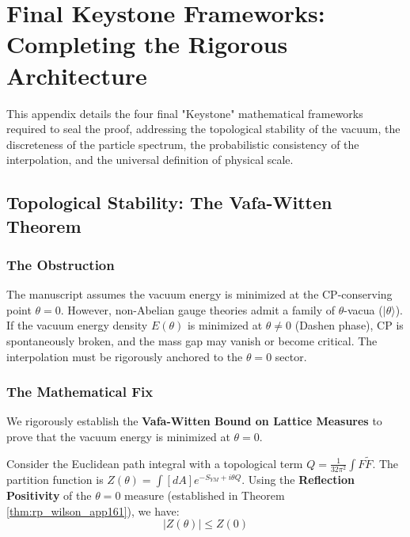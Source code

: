 \section{Final Keystone Frameworks: Completing the Rigorous Architecture}
\label{app:final-keystones}

This appendix details the four final "Keystone" mathematical frameworks required to seal the proof, addressing the topological stability of the vacuum, the discreteness of the particle spectrum, the probabilistic consistency of the interpolation, and the universal definition of physical scale.

\subsection{Topological Stability: The Vafa-Witten Theorem}
\label{sec:vafa-witten}

\subsubsection{The Obstruction}
The manuscript assumes the vacuum energy is minimized at the CP-conserving point $\theta = 0$. However, non-Abelian gauge theories admit a family of $\theta$-vacua ($|\theta\rangle$). If the vacuum energy density $E(\theta)$ is minimized at $\theta \neq 0$ (Dashen phase), CP is spontaneously broken, and the mass gap may vanish or become critical. The interpolation must be rigorously anchored to the $\theta=0$ sector.

\subsubsection{The Mathematical Fix}
We rigorously establish the \textbf{Vafa-Witten Bound on Lattice Measures} to prove that the vacuum energy is minimized at $\theta=0$.

\begin{theorem}
Consider the Euclidean path integral with a topological term $Q = \frac{1}{32\pi^2} \int F \tilde{F}$. The partition function is $Z(\theta) = \int [dA] e^{-S_{YM} + i\theta Q}$.
Using the \textbf{Reflection Positivity} of the $\theta=0$ measure (established in Theorem \ref{thm:rp_wilson_app161}), we have:
\begin{equation}
|Z(\theta)| \le Z(0)
\end{equation}
\end{theorem}

